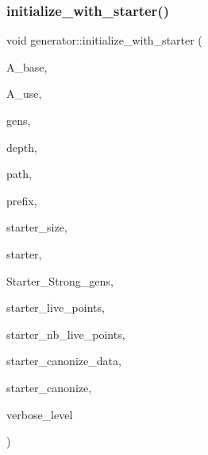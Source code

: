 \mbox{\label{classgenerator_a872384dc545e325ee3284e2f82e2bb8c}} 
\subsubsection{\texorpdfstring{initialize\+\_\+with\+\_\+starter()}{initialize\_with\_starter()}}
{\footnotesize\ttfamily void generator\+::initialize\+\_\+with\+\_\+starter (\begin{DoxyParamCaption}\item[{\mbox{\hyperlink{classaction}{action}} $\ast$}]{A\+\_\+base,  }\item[{\mbox{\hyperlink{classaction}{action}} $\ast$}]{A\+\_\+use,  }\item[{\mbox{\hyperlink{classstrong__generators}{strong\+\_\+generators}} $\ast$}]{gens,  }\item[{\mbox{\hyperlink{galois_8h_a09fddde158a3a20bd2dcadb609de11dc}{I\+NT}}}]{depth,  }\item[{\mbox{\hyperlink{galois_8h_ab6cc7b4aeb6ea31aba2b3fbfc83ff5e6}{B\+Y\+TE}} $\ast$}]{path,  }\item[{\mbox{\hyperlink{galois_8h_ab6cc7b4aeb6ea31aba2b3fbfc83ff5e6}{B\+Y\+TE}} $\ast$}]{prefix,  }\item[{\mbox{\hyperlink{galois_8h_a09fddde158a3a20bd2dcadb609de11dc}{I\+NT}}}]{starter\+\_\+size,  }\item[{\mbox{\hyperlink{galois_8h_a09fddde158a3a20bd2dcadb609de11dc}{I\+NT}} $\ast$}]{starter,  }\item[{\mbox{\hyperlink{classstrong__generators}{strong\+\_\+generators}} $\ast$}]{Starter\+\_\+\+Strong\+\_\+gens,  }\item[{\mbox{\hyperlink{galois_8h_a09fddde158a3a20bd2dcadb609de11dc}{I\+NT}} $\ast$}]{starter\+\_\+live\+\_\+points,  }\item[{\mbox{\hyperlink{galois_8h_a09fddde158a3a20bd2dcadb609de11dc}{I\+NT}}}]{starter\+\_\+nb\+\_\+live\+\_\+points,  }\item[{void $\ast$}]{starter\+\_\+canonize\+\_\+data,  }\item[{\mbox{\hyperlink{galois_8h_a09fddde158a3a20bd2dcadb609de11dc}{I\+NT}}($\ast$)(\mbox{\hyperlink{galois_8h_a09fddde158a3a20bd2dcadb609de11dc}{I\+NT}} $\ast$Set, \mbox{\hyperlink{galois_8h_a09fddde158a3a20bd2dcadb609de11dc}{I\+NT}} len, \mbox{\hyperlink{galois_8h_a09fddde158a3a20bd2dcadb609de11dc}{I\+NT}} $\ast$\mbox{\hyperlink{simeon_8_c_aec1406935bdb1fee3561fcb840964100}{Elt}}, void $\ast$data, \mbox{\hyperlink{galois_8h_a09fddde158a3a20bd2dcadb609de11dc}{I\+NT}} \mbox{\hyperlink{classgenerator_a7fedc6488314cbc00dbfcc42d311e1ce}{verbose\+\_\+level}})}]{starter\+\_\+canonize,  }\item[{\mbox{\hyperlink{galois_8h_a09fddde158a3a20bd2dcadb609de11dc}{I\+NT}}}]{verbose\+\_\+level }\end{DoxyParamCaption})}

